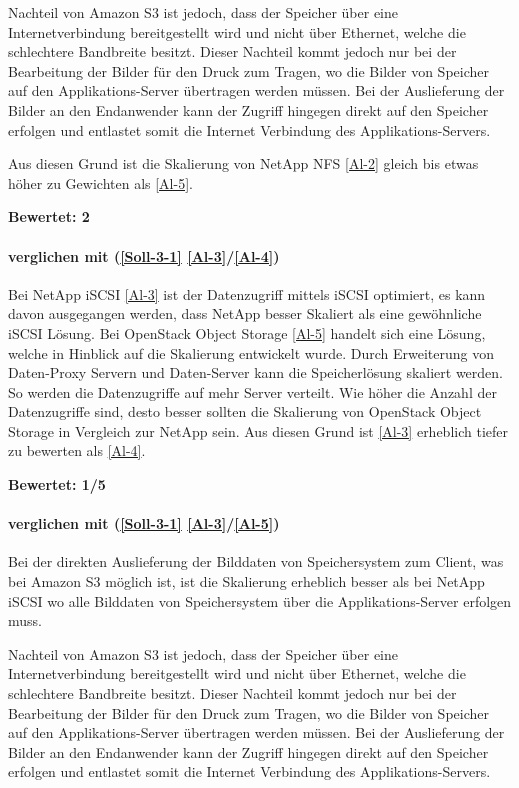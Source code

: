 Nachteil von Amazon S3 ist jedoch, dass der Speicher über eine Internetverbindung bereitgestellt wird und nicht über Ethernet, welche die schlechtere Bandbreite besitzt. Dieser Nachteil kommt jedoch nur bei der Bearbeitung der Bilder für den Druck zum Tragen, wo die Bilder von Speicher auf den Applikations-Server übertragen werden müssen. Bei der Auslieferung der Bilder an den Endanwender kann der Zugriff hingegen direkt auf den Speicher erfolgen und entlastet somit die Internet Verbindung des Applikations-Servers.

Aus diesen Grund ist die Skalierung von NetApp NFS \ref{Al-2} gleich bis etwas höher zu Gewichten als \ref{Al-5}.

\textbf{Bewertet: 2}

\paragraph*{  verglichen mit  (\ref{Soll-3-1} \ref{Al-3}/\ref{Al-4})}
Bei NetApp iSCSI \ref{Al-3} ist der Datenzugriff mittels iSCSI optimiert, es kann davon ausgegangen werden, dass NetApp besser Skaliert als eine gewöhnliche iSCSI Lösung. Bei OpenStack Object Storage \ref{Al-5} handelt sich eine Lösung, welche in Hinblick auf die Skalierung entwickelt wurde. Durch Erweiterung von Daten-Proxy Servern und Daten-Server kann die Speicherlösung skaliert werden. So werden die Datenzugriffe auf mehr Server verteilt. Wie höher die Anzahl der Datenzugriffe sind, desto besser sollten die Skalierung von OpenStack Object Storage in Vergleich zur NetApp sein.
Aus diesen Grund ist  \ref{Al-3} erheblich tiefer zu bewerten als  \ref{Al-4}.

\textbf{Bewertet: 1/5}

\paragraph*{  verglichen mit  (\ref{Soll-3-1} \ref{Al-3}/\ref{Al-5})}
Bei der direkten Auslieferung der Bilddaten von Speichersystem zum Client, was bei Amazon S3 möglich ist, ist die Skalierung erheblich besser als bei NetApp iSCSI wo alle Bilddaten von Speichersystem über die Applikations-Server erfolgen muss. 

Nachteil von Amazon S3 ist jedoch, dass der Speicher über eine Internetverbindung bereitgestellt wird und nicht über Ethernet, welche die schlechtere Bandbreite besitzt. Dieser Nachteil kommt jedoch nur bei der Bearbeitung der Bilder für den Druck zum Tragen, wo die Bilder von Speicher auf den Applikations-Server übertragen werden müssen. Bei der Auslieferung der Bilder an den Endanwender kann der Zugriff hingegen direkt auf den Speicher erfolgen und entlastet somit die Internet Verbindung des Applikations-Servers.


